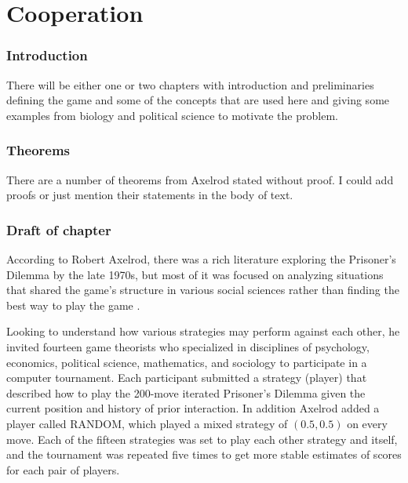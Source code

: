 


\chapter{Cooperation}

\subsection{Introduction}
There will be either one or two chapters with introduction and preliminaries defining the game and some of the concepts that are used here and giving some examples from biology and political science to motivate the problem.

\subsection{Theorems}
There are a number of theorems from Axelrod stated without proof. I could add proofs or just mention their statements in the body of text.

\subsection{Draft of chapter}

According to Robert Axelrod, there was a rich literature exploring the Prisoner's Dilemma by the late 1970s, but most of it was focused on analyzing situations that shared the game's structure in various social sciences rather than finding the best way to play the game \cite[p.28]{axelrod1984evolution}. 

Looking to understand how various strategies may perform against each other, he invited fourteen game theorists who specialized in disciplines of psychology, economics, political science, mathematics, and sociology to participate in a computer tournament. Each participant submitted a strategy (player) that described how to play the 200-move iterated Prisoner's Dilemma given the current position and history of prior interaction. In addition Axelrod added a player called RANDOM, which played a mixed strategy of $(0.5, 0.5)$  on every move. Each of the fifteen strategies was set to play each other strategy and itself, and the tournament was repeated five times to get more stable estimates of scores for each pair of players.


